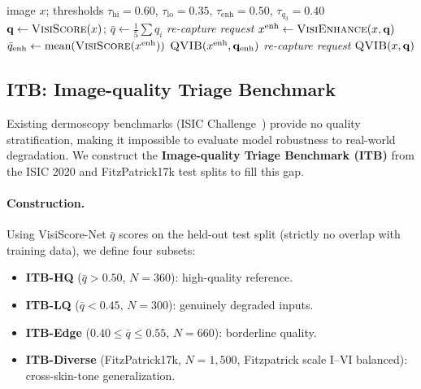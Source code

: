 \begin{algorithm}[t]
\caption{Dual-Channel Agent Inference}
\label{alg:agent}
\begin{algorithmic}[1]
  \REQUIRE image $x$; thresholds $\tau_{\text{hi}}=0.60$, $\tau_{\text{lo}}=0.35$, $\tau_{\text{enh}}=0.50$, $\tau_{q_3}=0.40$
  \STATE $\mathbf{q} \leftarrow \textsc{VisiScore}(x)$; $\bar{q} \leftarrow \frac{1}{5}\sum q_i$
    \RETURN \textit{re-capture request}  \hfill{}
    \STATE $x^{\text{enh}} \leftarrow \textsc{VisiEnhance}(x, \mathbf{q})$
    \STATE $\bar{q}_{\text{enh}} \leftarrow \text{mean}(\textsc{VisiScore}(x^{\text{enh}}))$
      \RETURN $\textsc{QVIB}(x^{\text{enh}}, \mathbf{q}_{\text{enh}})$  \hfill{}
    \ELSE
      \RETURN \textit{re-capture request}  \hfill{}
    \ENDIF
  \ELSE
    \RETURN $\textsc{QVIB}(x, \mathbf{q})$  \hfill{}
  \ENDIF
\end{algorithmic}
\end{algorithm}

\subsection{ITB: Image-quality Triage Benchmark}
\label{sec:method:itb}

Existing dermoscopy benchmarks (ISIC Challenge~\cite{codella2018skin,codella2019skin}) provide no quality stratification, making it impossible to evaluate model robustness to real-world degradation.
We construct the \textbf{Image-quality Triage Benchmark (ITB)} from the ISIC 2020 and FitzPatrick17k test splits to fill this gap.

\paragraph{Construction.}
Using VisiScore-Net $\bar{q}$ scores on the held-out test split (strictly no overlap with training data), we define four subsets:
\begin{itemize}[itemsep=2pt]
  \item \textbf{ITB-HQ} ($\bar{q} > 0.50$, $N = 360$): high-quality reference.
  \item \textbf{ITB-LQ} ($\bar{q} < 0.45$, $N = 300$): genuinely degraded inputs.
  \item \textbf{ITB-Edge} ($0.40 \leq \bar{q} \leq 0.55$, $N = 660$): borderline quality.
  \item \textbf{ITB-Diverse} (FitzPatrick17k, $N = 1{,}500$, Fitzpatrick scale I–VI balanced): cross-skin-tone generalization.
\end{itemize}

